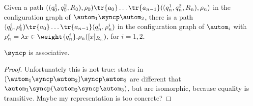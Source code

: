 \begin{corollary}
Given a path $((q_0^1,q_0^2,R_0),\rho_0) \tr{a_0} \dots \tr{a_{n-1}} ((q_n^1,q_n^2,R_n),\rho_n)$ in the configuration graph of $\autom_1 \syncp \autom_2$, there is a path $(q_0^i,\rho_0^i) \tr{a_0} \dots \tr{a_{n-1}} (q_n^i,\rho_n^i)$ in the configuration graph of $\autom_i$ with $\rho_n^i = \lambda x \in \weight{q_n^i}.\rho_n([x]_{R_n})$, for $i=1,2$.
\end{corollary}

\begin{proposition}
$\syncp$ is associative.
\end{proposition}

\begin{proof}
Unfortunately this is not true: states in $(\autom_1 \syncp \autom_2 ) \syncp \autom_3$ are different that $\autom_1 \syncp (\autom_2 \syncp \autom_3)$, but are isomorphic, because equality is transitive. Maybe my representation is too concrete?
\end{proof}

